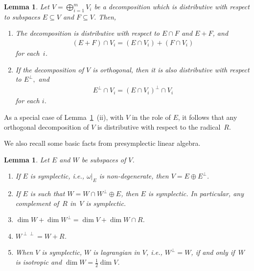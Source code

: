 \documentclass[10pt,a4paper]{amsart}
\numberwithin{equation}{section}
\newtheorem{Lemma}[Theorem]{Lemma}
\begin{document}
\begin{Lemma}\label{distributivity properties}
Let $V = \bigoplus_{i=1}^m V_i$ be a decomposition which is distributive with respect to subspaces $E \subseteq V$ and $F \subseteq V$. Then,
\begin{enumerate}[{\rm (i)}]\itemsep=0pt
\item The decomposition is distributive with respect to $E \cap F$ and $E + F$, and
\begin{gather*}%
(E + F) \cap V_i = (E \cap V_i) + (F \cap V_i)
\end{gather*}
for each~$i$.
\item If the decomposition of $V$ is orthogonal, then it is also distributive with respect to $E^{\perp},$ and
\begin{gather*}%
E^{\perp} \cap V_i = (E \cap V_i)^{\perp} \cap V_i
\end{gather*}
for each $i$.
\end{enumerate}
\end{Lemma}

\begin{Remark}\label{radical distributivity}
As a special case of Lemma~\ref{distributivity properties}~(ii), with $V$ in the role of $E$, it follows that any orthogonal decomposition of $V$ is distributive with respect to the radical~$R$.
\end{Remark}

We also recall some basic facts from presymplectic linear algebra.

\begin{Lemma}\label{linear algebra}
Let $E$ and $W$ be subspaces of $V$.
\begin{enumerate}[{\rm (i)}]\itemsep=0pt
\item If $E$ is symplectic, i.e., $\omega \vert_{E}$ is non-degenerate, then $V = E \oplus E^{\perp}$.
\item If $E$ is such that $W = W \cap W^{\perp} \oplus E$, then $E$ is symplectic. In particular, any complement of~$R$ in~$V$ is symplectic.
\item $\dim W + \dim W^{\perp} =  \dim V + \dim W \cap R$.
\item $W^{\perp \perp} = W + R$.
\item When $V$ is symplectic, $W$ is  {lagrangian} in $V$, i.e., $W^{\perp} = W$, if and only if~$W$ is isotropic and $\dim W = \tfrac{1}{2} \dim V$.
\end{enumerate}
\end{Lemma}
\end{document}
